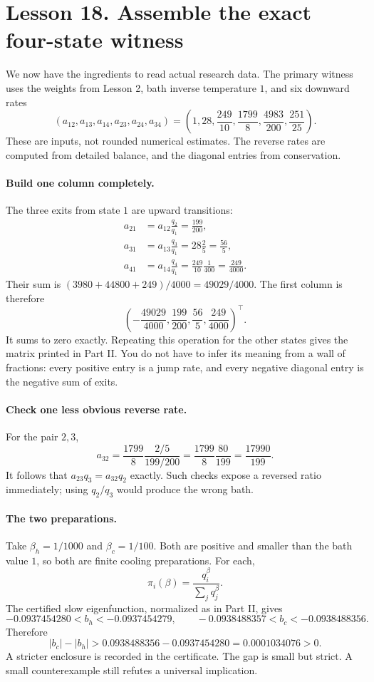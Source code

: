 \documentclass[11pt]{article}
\begin{document}
\clearpage
\section*{Lesson 18. Assemble the exact four-state witness}
We now have the ingredients to read actual research data. The primary
witness uses the weights from Lesson 2, bath inverse temperature $1$, and
six downward rates
\[
(a_{12},a_{13},a_{14},a_{23},a_{24},a_{34})
=\left(1,28,\frac{249}{10},\frac{1799}{8},
\frac{4983}{200},\frac{251}{25}\right).
\]
These are inputs, not rounded numerical estimates. The reverse rates are
computed from detailed balance, and the diagonal entries from conservation.

\paragraph{Build one column completely.}
The three exits from state $1$ are upward transitions:
\begin{align*}
a_{21}&=a_{12}\frac{q_2}{q_1}=\frac{199}{200},\\
a_{31}&=a_{13}\frac{q_3}{q_1}=28\frac25=\frac{56}{5},\\
a_{41}&=a_{14}\frac{q_4}{q_1}=\frac{249}{10}\frac1{400}
=\frac{249}{4000}.
\end{align*}
Their sum is $(3980+44800+249)/4000=49029/4000$.
The first column is therefore
\[
\left(-\frac{49029}{4000},\frac{199}{200},
\frac{56}{5},\frac{249}{4000}\right)^\top.
\]
It sums to zero exactly. Repeating this operation for the other states gives
the matrix printed in Part II. You do not have to infer its meaning from a
wall of fractions: every positive entry is a jump rate, and every negative
diagonal entry is the negative sum of exits.

\paragraph{Check one less obvious reverse rate.}
For the pair $2,3$,
\[
a_{32}=\frac{1799}{8}\frac{2/5}{199/200}
=\frac{1799}{8}\frac{80}{199}=\frac{17990}{199}.
\]
It follows that $a_{23}q_3=a_{32}q_2$ exactly. Such checks expose a reversed
ratio immediately; using $q_2/q_3$ would produce the wrong bath.

\paragraph{The two preparations.}
Take $\beta_h=1/1000$ and $\beta_c=1/100$. Both are positive and smaller
than the bath value $1$, so both are finite cooling preparations. For each,
\[
\pi_i(\beta)=\frac{q_i^\beta}{\sum_jq_j^\beta}.
\]
The certified slow eigenfunction, normalized as in Part II, gives
\[
-0.0937454280<b_h<-0.0937454279,
\qquad
-0.0938488357<b_c<-0.0938488356.
\]
Therefore
\[
|b_c|-|b_h|>0.0938488356-0.0937454280=0.0001034076>0.
\]
A stricter enclosure is recorded in the certificate. The gap is small but
strict. A small counterexample still refutes a universal implication.
\end{document}

